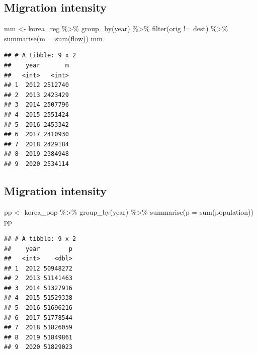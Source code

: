 \documentclass[
]{book}
\newenvironment{Shaded}{\begin{snugshade}}{\end{snugshade}}
\newcommand{\AttributeTok}[1]{\textcolor[rgb]{0.77,0.63,0.00}{#1}}
\newcommand{\FunctionTok}[1]{\textcolor[rgb]{0.00,0.00,0.00}{#1}}
\newcommand{\NormalTok}[1]{#1}
\newcommand{\OtherTok}[1]{\textcolor[rgb]{0.56,0.35,0.01}{#1}}
\newcommand{\SpecialCharTok}[1]{\textcolor[rgb]{0.00,0.00,0.00}{#1}}
\begin{document}
\hypertarget{migration-intensity-5}{%
\subsection{Migration intensity}\label{migration-intensity-5}}

\begin{Shaded}
\begin{Highlighting}[]
\NormalTok{mm }\OtherTok{\textless{}{-}}\NormalTok{ korea\_reg }\SpecialCharTok{\%\textgreater{}\%}
  \FunctionTok{group\_by}\NormalTok{(year) }\SpecialCharTok{\%\textgreater{}\%}
  \FunctionTok{filter}\NormalTok{(orig }\SpecialCharTok{!=}\NormalTok{ dest) }\SpecialCharTok{\%\textgreater{}\%}
  \FunctionTok{summarise}\NormalTok{(}\AttributeTok{m =} \FunctionTok{sum}\NormalTok{(flow))}
\NormalTok{mm}
\end{Highlighting}
\end{Shaded}

\begin{verbatim}
## # A tibble: 9 x 2
##    year       m
##   <int>   <int>
## 1  2012 2512740
## 2  2013 2423429
## 3  2014 2507796
## 4  2015 2551424
## 5  2016 2453342
## 6  2017 2410930
## 7  2018 2429184
## 8  2019 2384948
## 9  2020 2534114
\end{verbatim}

\hypertarget{migration-intensity-6}{%
\subsection{Migration intensity}\label{migration-intensity-6}}

\begin{Shaded}
\begin{Highlighting}[]
\NormalTok{pp }\OtherTok{\textless{}{-}}\NormalTok{ korea\_pop }\SpecialCharTok{\%\textgreater{}\%}
  \FunctionTok{group\_by}\NormalTok{(year) }\SpecialCharTok{\%\textgreater{}\%}
  \FunctionTok{summarise}\NormalTok{(}\AttributeTok{p =} \FunctionTok{sum}\NormalTok{(population))}
\NormalTok{pp}
\end{Highlighting}
\end{Shaded}

\begin{verbatim}
## # A tibble: 9 x 2
##    year        p
##   <int>    <dbl>
## 1  2012 50948272
## 2  2013 51141463
## 3  2014 51327916
## 4  2015 51529338
## 5  2016 51696216
## 6  2017 51778544
## 7  2018 51826059
## 8  2019 51849861
## 9  2020 51829023
\end{verbatim}
\end{document}
